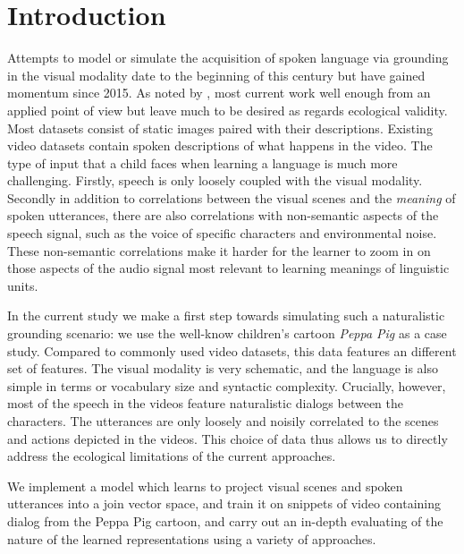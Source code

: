 \section{Introduction}
\label{sec:intro}

Attempts to model or simulate the acquisition of spoken language via
grounding in the visual modality date to the beginning of this century
\citep{roypentland2002learning} but have gained momentum since
2015. As noted by \citep{chrupala-visually-2021}, most current work
well enough from an applied point of view but leave much to be desired
as regards ecological validity. Most datasets consist of static images
paired with their descriptions. Existing video datasets contain spoken
descriptions of what happens in the video. The type of input that a
child faces when learning a language is much more challenging.
Firstly, speech is only loosely coupled with the visual
modality. Secondly in addition to correlations between the visual
scenes and the {\it meaning} of spoken utterances, there are also
correlations with non-semantic aspects of the speech signal, such as
the voice of specific characters and environmental noise. These
non-semantic correlations make it harder for the learner to zoom in
on those aspects of the audio signal most relevant to learning
meanings of linguistic units. 

In the current study we make a first step towards simulating such a
naturalistic grounding scenario: we use the well-know children's
cartoon {\it Peppa Pig} as a case study. Compared to commonly used
video datasets, this data features an different set of features. The
visual modality is very schematic, and the language is also simple in
terms or vocabulary size and syntactic complexity. Crucially, however,
most of the speech in the videos feature naturalistic dialogs between
the characters. The utterances are only loosely and noisily correlated
to the scenes and actions depicted in the videos. This choice of data
thus allows us to directly address the ecological limitations of the
current approaches.

We implement a model which learns to project visual scenes and spoken
utterances into a join vector space, and train it on snippets of
video containing dialog from the Peppa Pig cartoon, and carry out an
in-depth evaluating of the nature of the learned representations using
a variety of approaches.
